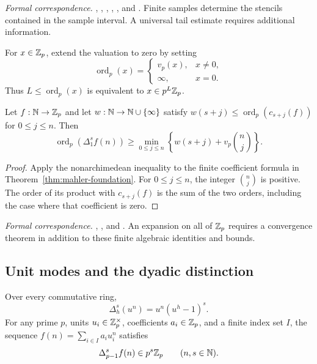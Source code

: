 \begingroup\small\raggedright
\noindent\emph{Formal correspondence.}
,
,
,
,
, and
.
Finite samples determine the stencils contained in the sample interval.
A universal tail estimate requires additional information.
\par\endgroup

For $x\in\mathbb Z_p$, extend the valuation to zero by setting
\[
\operatorname{ord}_p(x)=
\begin{cases}v_p(x),&x\ne0,\\\infty,&x=0.\end{cases}
\]
Thus $L\leq\operatorname{ord}_p(x)$ is equivalent to $x\in p^L\mathbb Z_p$.

\begin{theorem}
\label{thm:weighted-mahler-foundation}
Let $f:\mathbb N\to\mathbb Z_p$ and let $w:\mathbb N\to\mathbb N\cup\{\infty\}$ satisfy
$w(s+j)\leq\operatorname{ord}_p(c_{s+j}(f))$ for $0\leq j\leq n$.
Then
\[
\operatorname{ord}_p(\Delta_1^s f(n))\geq
\min_{0\leq j\leq n}
\left\{w(s+j)+v_p\binom nj\right\}.
\]
\end{theorem}

\begin{proof}
Apply the nonarchimedean inequality to the finite coefficient formula in
Theorem~\ref{thm:mahler-foundation}. For $0\leq j\leq n$, the integer
$\binom nj$ is positive. The order of its product with $c_{s+j}(f)$ is the
sum of the two orders, including the case where that coefficient is zero.
\end{proof}

\begingroup\small\raggedright
\noindent\emph{Formal correspondence.}
,
, and
.
An expansion on all of $\mathbb Z_p$ requires a convergence theorem in addition to
these finite algebraic identities and bounds.
\par\endgroup

\subsection{Unit modes and the dyadic distinction}

\begin{theorem}
\label{thm:unit-modes-foundation}
Over every commutative ring,
\[
\Delta_h^s(u^n)=u^n(u^h-1)^s.
\]
For any prime $p$, units $u_i\in\mathbb Z_p^\times$, coefficients $a_i\in\mathbb Z_p$, and
a finite index set $I$, the sequence $f(n)=\sum_{i\in I}a_i u_i^n$ satisfies
\[
\Delta_{p-1}^s f(n)\in p^s\mathbb Z_p
\qquad(n,s\in\mathbb N).
\]
\end{theorem}

